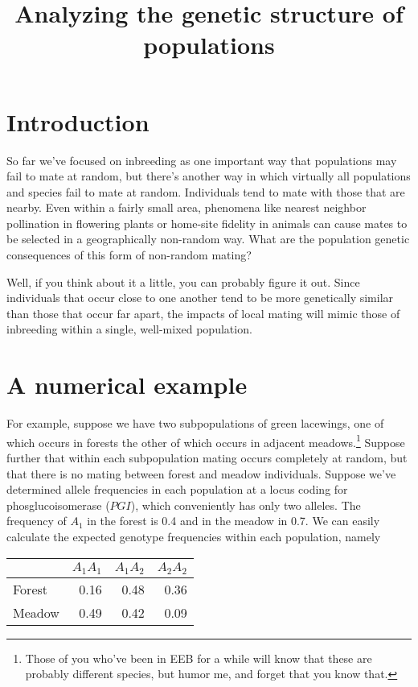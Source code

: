 \documentclass[12pt]{article}
\title{Analyzing the genetic structure of populations}
\begin{document}
\maketitle

\thispagestyle{first}

\section*{Introduction}

So far we've focused on inbreeding as one important way that
populations may fail to mate at random, but there's another way in
which virtually all populations and species fail to mate at
random. Individuals tend to mate with those that are nearby. Even
within a fairly small area, phenomena like nearest neighbor
pollination in flowering plants or home-site fidelity in animals can
cause mates to be selected in a geographically non-random way. What
are the population genetic consequences of this form of non-random
mating?

Well, if you think about it a little, you can probably figure it
out. Since individuals that occur close to one another tend to be more
genetically similar than those that occur far apart, the impacts of
local mating will mimic those of inbreeding within a single,
well-mixed population.

\section*{A numerical example}

For example, suppose we have two subpopulations of green lacewings,
one of which occurs in forests the other of which occurs in adjacent
meadows.\footnote{Those of you who've been in EEB for a while will
  know that these are probably different species, but humor me, and
  forget that you know that.} Suppose further that within each
subpopulation mating occurs completely at random, but that there is no
mating between forest and meadow individuals. Suppose we've determined
allele frequencies in each population at a locus coding for
phosglucoisomerase ($PGI$), which conveniently has only two
alleles. The frequency of $A_1$ in the forest is 0.4 and in the meadow
in 0.7. We can easily calculate the expected genotype frequencies
within each population, namely

\begin{center}
\begin{tabular}{l|rrr}
\hline\hline
       & $A_1A_1$ & $A_1A_2$ & $A_2A_2$ \\
\hline
Forest &     0.16 &     0.48 &     0.36 \\
Meadow &     0.49 &     0.42 &     0.09 \\
\hline
\end{tabular}
\end{center}
\end{document}
